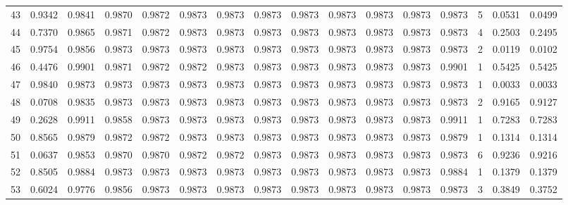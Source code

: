 \begin{tabular}{lrrrrrrrrrrrrrrr}
43  &      0.9342 &  0.9841 &  0.9870 &  0.9872 &  0.9873 &  0.9873 &  0.9873 &  0.9873 &  0.9873 &  0.9873 &   0.9873 &     0.9873 &      5 &                    0.0531 &                     0.0499 \\
44  &      0.7370 &  0.9865 &  0.9871 &  0.9872 &  0.9873 &  0.9873 &  0.9873 &  0.9873 &  0.9873 &  0.9873 &   0.9873 &     0.9873 &      4 &                    0.2503 &                     0.2495 \\
45  &      0.9754 &  0.9856 &  0.9873 &  0.9873 &  0.9873 &  0.9873 &  0.9873 &  0.9873 &  0.9873 &  0.9873 &   0.9873 &     0.9873 &      2 &                    0.0119 &                     0.0102 \\
46  &      0.4476 &  0.9901 &  0.9871 &  0.9872 &  0.9872 &  0.9873 &  0.9873 &  0.9873 &  0.9873 &  0.9873 &   0.9873 &     0.9901 &      1 &                    0.5425 &                     0.5425 \\
47  &      0.9840 &  0.9873 &  0.9873 &  0.9873 &  0.9873 &  0.9873 &  0.9873 &  0.9873 &  0.9873 &  0.9873 &   0.9873 &     0.9873 &      1 &                    0.0033 &                     0.0033 \\
48  &      0.0708 &  0.9835 &  0.9873 &  0.9873 &  0.9873 &  0.9873 &  0.9873 &  0.9873 &  0.9873 &  0.9873 &   0.9873 &     0.9873 &      2 &                    0.9165 &                     0.9127 \\
49  &      0.2628 &  0.9911 &  0.9858 &  0.9873 &  0.9873 &  0.9873 &  0.9873 &  0.9873 &  0.9873 &  0.9873 &   0.9873 &     0.9911 &      1 &                    0.7283 &                     0.7283 \\
50  &      0.8565 &  0.9879 &  0.9872 &  0.9872 &  0.9873 &  0.9873 &  0.9873 &  0.9873 &  0.9873 &  0.9873 &   0.9873 &     0.9879 &      1 &                    0.1314 &                     0.1314 \\
51  &      0.0637 &  0.9853 &  0.9870 &  0.9870 &  0.9872 &  0.9872 &  0.9873 &  0.9873 &  0.9873 &  0.9873 &   0.9873 &     0.9873 &      6 &                    0.9236 &                     0.9216 \\
52  &      0.8505 &  0.9884 &  0.9873 &  0.9873 &  0.9873 &  0.9873 &  0.9873 &  0.9873 &  0.9873 &  0.9873 &   0.9873 &     0.9884 &      1 &                    0.1379 &                     0.1379 \\
53  &      0.6024 &  0.9776 &  0.9856 &  0.9873 &  0.9873 &  0.9873 &  0.9873 &  0.9873 &  0.9873 &  0.9873 &   0.9873 &     0.9873 &      3 &                    0.3849 &                     0.3752 \\

\end{tabular}
